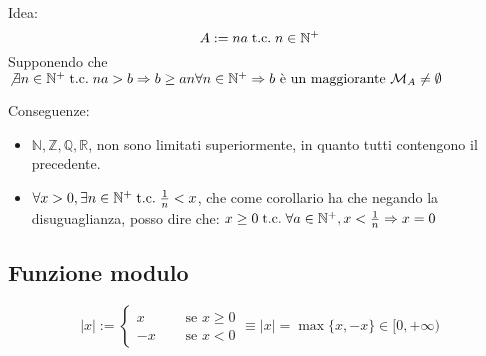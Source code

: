 \documentclass[a4paper,12pt]{article}
\begin{document}
	Idea:
	\[A :=  na \;\text{t.c.}\; n \in \mathbb{N}^+\]
	Supponendo che $\not \exists n \in \mathbb{N}^+ \;\text{t.c.}\; na > b \Rightarrow b \geq an \forall n \in \mathbb{N}^+ \Rightarrow b \text{ è un maggiorante } \mathcal{M}_A \not = \emptyset $ %
	
	Conseguenze:
	\begin{itemize}
		\item $\mathbb{N}, \mathbb{Z}, \mathbb{Q}, \mathbb{R}$, non sono limitati superiormente, in quanto tutti contengono il precedente.
		\item $\forall x > 0, \exists n \in \mathbb{N}^+ \;\text{t.c.}\; \frac{1}{n} < x$, che come corollario ha che negando la disuguaglianza, posso dire che:
		$x \geq 0 \;\text{t.c.}\; \forall a \in \mathbb{N}^+, x < \frac{1}{n} \Rightarrow x = 0$
	\end{itemize}
	
	\subsection{Funzione modulo}
	\[|x| := 
	\left\{
	\begin{aligned}
		x & \quad \text{ se } x \geq 0\\
		-x & \quad \text{ se } x < 0
	\end{aligned}
	\right. \equiv |x| = \max\{x, -x\} \in [0, +\infty)
	\]
	
\end{document}
